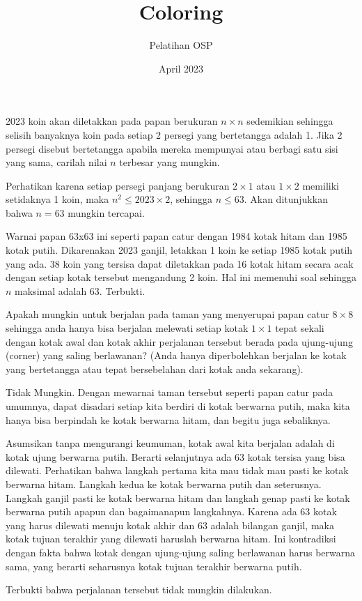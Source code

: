\documentclass[11pt]{scrartcl}
\title{Coloring}
\author{Pelatihan OSP}
\date{April 2023}
\begin{document}
\maketitle
\begin{soaljawab}
    2023 koin akan diletakkan pada papan berukuran $n \times n$ sedemikian sehingga selisih banyaknya koin pada setiap 2 persegi yang bertetangga adalah 1. Jika 2 persegi disebut bertetangga apabila mereka mempunyai atau berbagi satu sisi yang sama, carilah nilai $n$ terbesar yang mungkin.
    \begin{solusi}
        Perhatikan karena setiap persegi panjang berukuran $2 \times 1$ atau $1 \times 2$ memiliki setidaknya 1 koin, maka $n^2 \le 2023 \times 2$, sehingga $n \le 63$. Akan ditunjukkan bahwa $n=63$ mungkin tercapai.

        Warnai papan 63x63 ini seperti papan catur dengan 1984 kotak hitam dan 1985 kotak putih. Dikarenakan 2023 ganjil, letakkan 1 koin ke setiap 1985 kotak putih yang ada. 38 koin yang tersisa dapat diletakkan pada 16 kotak hitam secara acak dengan setiap kotak tersebut mengandung 2 koin. Hal ini memenuhi soal sehingga $n$ maksimal adalah 63. Terbukti.
    \end{solusi}
\end{soaljawab}

\begin{soaljawab}
    Apakah mungkin untuk berjalan pada taman yang menyerupai papan catur $8 \times 8$ sehingga anda hanya bisa berjalan melewati setiap kotak $1 \times 1$ tepat sekali dengan kotak awal dan kotak akhir perjalanan tersebut berada pada ujung-ujung (corner) yang saling berlawanan? (Anda hanya diperbolehkan berjalan ke kotak yang bertetangga atau tepat bersebelahan dari kotak anda sekarang).
    \begin{solusi}
        Tidak Mungkin. Dengan mewarnai taman tersebut seperti papan catur pada umumnya, dapat disadari setiap kita berdiri di kotak berwarna putih, maka kita hanya bisa berpindah ke kotak berwarna hitam, dan begitu juga sebaliknya. 
        
        Asumsikan tanpa mengurangi keumuman, kotak awal kita berjalan adalah di kotak ujung berwarna putih. Berarti selanjutnya ada 63 kotak tersisa yang bisa dilewati. Perhatikan bahwa langkah pertama kita mau tidak mau pasti ke kotak berwarna hitam. Langkah kedua ke kotak berwarna putih dan seterusnya. Langkah ganjil pasti ke kotak berwarna hitam dan langkah genap pasti ke kotak berwarna putih apapun dan bagaimanapun langkahnya. Karena ada 63 kotak yang harus dilewati menuju kotak akhir dan 63 adalah bilangan ganjil, maka kotak tujuan terakhir yang dilewati haruslah berwarna hitam. Ini kontradiksi dengan fakta bahwa kotak dengan ujung-ujung saling berlawanan harus berwarna sama, yang berarti seharusnya kotak tujuan terakhir berwarna putih.

        Terbukti bahwa perjalanan tersebut tidak mungkin dilakukan.
    \end{solusi}
\end{soaljawab}
\end{document}
